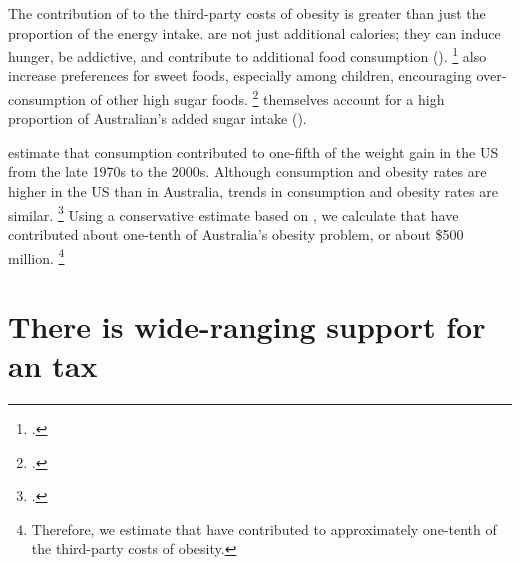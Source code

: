 \documentclass[embargoed]{grattan}
\begin{document}
The contribution of \SSBs{} to the third-party costs of obesity is greater than just the proportion of the energy intake.
\SSBs{} are not just additional calories; they can induce hunger, be addictive, and contribute to additional food consumption ().%
\footcites{Vartanian2007Effectssoftdrink}{Lennerz2013Effectsdietaryglycemic}{Schulte2015Currentconsiderationsregarding}{Fortuna2012obesityepidemicfood}{Popkin2012Sugarybeveragesrepresent}{Panel2014POLICYBRIEFoptions} \SSBs{} also increase preferences for sweet foods, especially among children, encouraging over-consumption of other high sugar foods.%
\footcite{Popkin2012Sugarybeveragesrepresent} \SSBs{} themselves account for a high proportion of Australian's added sugar intake ().

\textcite{Woodward-Lopez2010whatextenthave} estimate that \SSB{} consumption contributed to one-fifth of the weight gain in the US from the late 1970s to the 2000s.
Although \SSB{} consumption and obesity rates are higher in the US than in Australia, trends in \SSB{} consumption and obesity rates are similar.%
\footcites{Popkin2016Sweeteningglobaldiet}{Silver2015IdBuyEmerging} Using a conservative estimate based on \textcite{Woodward-Lopez2010whatextenthave}, we calculate that \SSBs{} have contributed about one-tenth of Australia's obesity problem, or about \$500 million.%
\footnote{Therefore, we estimate that \SSBs{} have contributed to approximately one-tenth of the third-party costs of obesity.}

\section{There is wide-ranging support for an \SSB{} tax}\label{there-is-wide-ranging-support-for-an-ssb-tax}
\end{document}
